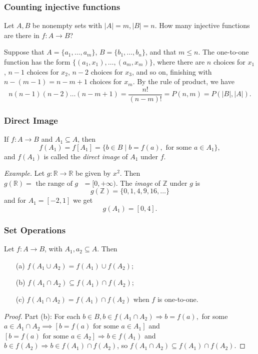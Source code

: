\documentclass[11pt]{article}
\begin{document}
        \subsubsection{Counting injective functions}

        Let \(A,B\) be nonempty sets with \(|A| = m, |B| = n.\) How many injective functions are there in \(f:A \rightarrow B\)?

        \vspace{1em}

        Suppose that \(A = \{a_1, \dots, a_m\}\), \(B = \{b_1, \dots, b_n\}\), and that \(m \leq n\). The one-to-one function has the form \(\{(a_1,x_1), \dots, (a_m, x_m)\}\), where there are $n$ choices for \(x_1\), \(n-1\) choices for \(x_2\), \(n-2\) choices for \(x_3\), and so on, finishing with \(n - (m - 1) = n - m + 1\) choices for \(x_m\). By the rule of product, we have \[n(n-1)(n-2) \dots (n - m + 1) = \frac{n!}{(n - m)!} = P(n,m) = P(|B|,|A|).\]

        \subsubsection{Direct Image}

        If \(f: A \rightarrow B\) and \(A_1 \subseteq A\), then \[f(A_1) = f[A_1] = \{b \in B \mid b = f(a), \text{ for some } a \in A_1\},\] and \(f(A_1)\) is called the \emph{direct image} of \(A_1\) under $f$.

        \vspace{1em}

        \emph{Example.} Let \(g: \mathbb{R} \rightarrow \mathbb{R}\) be given by \(x^2\). Then \(g(\mathbb{R}) = \text{ the range of $g$ } = [0, + \infty).\) The \emph{image} of \(\mathbb{Z}\) under $g$ is \[g(\mathbb{Z}) = \{0,1,4,9,16, \dots\}\] and for \(A_1 = [-2,1]\) we get \[g(A_1) = [0,4].\]

        \subsubsection{Set Operations}

        Let \(f: A \rightarrow B\), with \(A_1, a_2 \subseteq A\). Then
        \begin{enumerate}
            \item[(a)] \(f(A_1 \cup A_2) = f(A_1) \cup f(A_2);\)
            \item[(b)] \(f(A_1 \cap A_2) \subseteq f(A_1) \cap f(A_2)\);
            \item[(c)] \(f(A_1 \cap A_2) = f(A_1) \cap f(A_2)\) when $f$ is one-to-one.   
        \end{enumerate}
        \begin{proof}
            Part (b): For each \(b \in B, b \in f(A_1 \cap A_2) \Rightarrow b = f(a),\) for some \(a \in A_1 \cap A_2 \implies [b = f(a) \text{ for some } a \in A_1]\) and \([b = f(a) \text{ for some } a \in A_2] \Rightarrow b \in f(A_1)\) and \(b \in f(A_2) \Rightarrow b \in f(A_1) \cap f(A_2)\), so \(f(A_1 \cap A_2) \subseteq f(A_1) \cap f(A_2)\).
        \end{proof}
\end{document}
